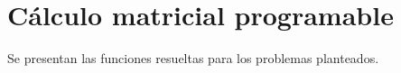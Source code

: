 \section{Cálculo matricial programable}

  Se presentan las funciones resueltas para los problemas planteados. 
  
  